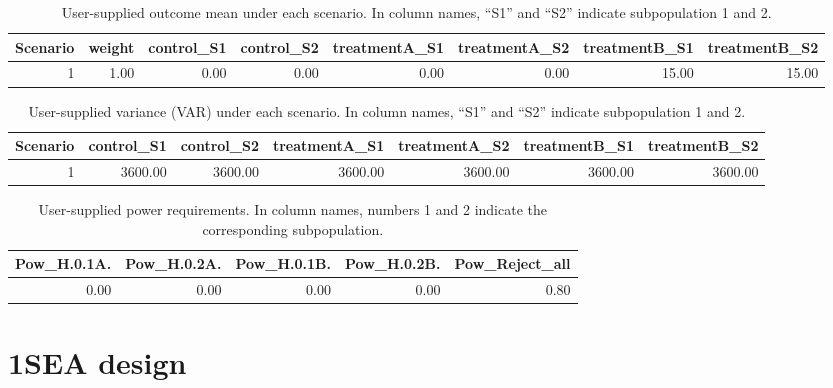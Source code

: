 \documentclass{article}\usepackage[]{graphicx}\usepackage[]{color}
\numberwithin{table}{section}
\numberwithin{figure}{section}
\begin{document}
\begin{table}[ht]
\centering
\begin{tabular}{rrrrrrrr}
  \hline
Scenario & weight & control\_S1 & control\_S2 & treatmentA\_S1 & treatmentA\_S2 & treatmentB\_S1 & treatmentB\_S2 \\ 
  \hline
1 & 1.00 & 0.00 & 0.00 & 0.00 & 0.00 & 15.00 & 15.00 \\ 
   \hline
\end{tabular}
\caption[User-supplied outcome mean under each scenario.]{User-supplied outcome mean under each scenario. In column names, ``S1'' and ``S2'' indicate subpopulation 1 and 2.} 
\label{tab:ui-outcome-mean}
\end{table}
\begin{table}[ht]
\centering
\begin{tabular}{rrrrrrr}
  \hline
Scenario & control\_S1 & control\_S2 & treatmentA\_S1 & treatmentA\_S2 & treatmentB\_S1 & treatmentB\_S2 \\ 
  \hline
  1 & 3600.00 & 3600.00 & 3600.00 & 3600.00 & 3600.00 & 3600.00 \\ 
   \hline
\end{tabular}
\caption[User-supplied outcome standard deviation under each scenario.]{User-supplied variance (VAR) under each scenario. In column names, ``S1'' and ``S2'' indicate subpopulation 1 and 2.} 
\label{tab:ui-outcome-sd}
\end{table}




\begin{table}[ht]
\centering
\begin{tabular}{rrrrr}
  \hline
Pow\_H.0.1A. & Pow\_H.0.2A. & Pow\_H.0.1B. & Pow\_H.0.2B. & Pow\_Reject\_all \\ 
  \hline
0.00 & 0.00 & 0.00 & 0.00 & 0.80 \\ 
   \hline
\end{tabular}
\caption[User-supplied power requirements.]{User-supplied power requirements. In column names, numbers 1 and 2 indicate the corresponding subpopulation.} 
\label{tab:desired-power}
\end{table}





\clearpage
\section{1SEA design}
\end{document}

